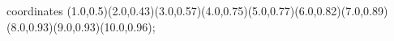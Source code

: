 					coordinates { (1.0,0.5)(2.0,0.43)(3.0,0.57)(4.0,0.75)(5.0,0.77)(6.0,0.82)(7.0,0.89)(8.0,0.93)(9.0,0.93)(10.0,0.96)};